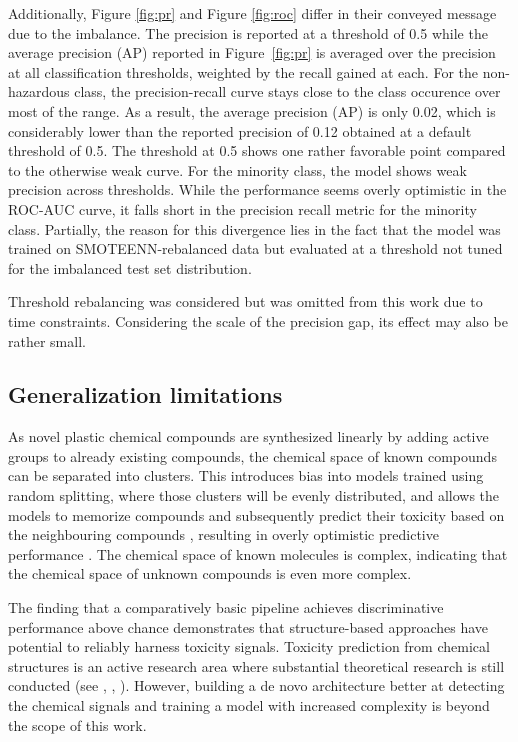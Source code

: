 \documentclass[hidelinks,11pt]{article}
\begin{document}
Additionally, Figure \ref{fig:pr} and Figure \ref{fig:roc} differ in their conveyed message due to the imbalance.
The precision is reported at a threshold of 0.5 while the average precision (AP) reported in Figure~\ref{fig:pr}
is averaged over the precision at all classification thresholds, weighted by the recall gained at each.
For the non-hazardous class, the precision-recall curve stays close to the class occurence over most of the range.
As a result, the average precision (AP) is only 0.02, 
which is considerably lower than the reported precision of 0.12 obtained at a default threshold of 0.5.
The threshold at 0.5 shows one rather favorable point compared to the otherwise weak curve.
For the minority class, the model shows weak precision across thresholds.
While the performance seems overly optimistic in the ROC-AUC curve, it falls short in 
the precision recall metric for the minority class. 
Partially, the reason for this divergence lies in the fact that the model was trained on 
SMOTEENN-rebalanced data but evaluated at a threshold not tuned for the imbalanced test set distribution.

Threshold rebalancing was considered but was omitted from this work due to time constraints.
Considering the scale of the precision gap, its effect may also be rather small.

\subsection{Generalization limitations}
As novel plastic chemical compounds are synthesized linearly by adding active groups
to already existing compounds, the chemical space of known compounds can be separated
into clusters. This introduces bias into models trained using random splitting, where those
clusters will be evenly distributed, and allows the models to memorize compounds and
subsequently predict their toxicity based on the neighbouring compounds \parencite{rileyThreePitfallsAvoid2019b},
resulting in overly optimistic predictive performance \parencite{guoScaffoldSplitsOverestimate2024}.
The chemical space of known molecules is complex, indicating that the chemical space of unknown compounds
is even more complex.

The finding that a comparatively basic pipeline achieves discriminative performance above chance demonstrates
that structure-based approaches have potential to reliably harness toxicity signals.
Toxicity prediction from chemical structures is an active research area where
substantial theoretical research is still conducted 
(see \cite{sealMachineLearningToxicity2025}, \cite{monemDrugToxicityPrediction2025a},
\cite{huangSubstructureguidedDeepGraph2026}).
However, building a de novo architecture better at detecting the chemical signals 
and training a model with increased complexity is beyond the scope of this work.
\end{document}
